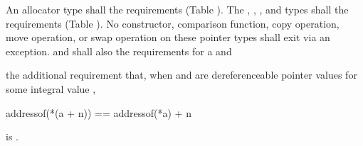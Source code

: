 \setcounter{Paras}{4}
\pnum
An allocator type  shall  the
 requirements (Table ).
The , , , and
 types shall  the
 requirements (Table ).
No constructor,
comparison function, copy operation, move operation, or swap operation on
these pointer types shall exit via an exception.  and  shall also
 the requirements for
a  and
\begin{addedblock}
the additional requirement that, when  and  are
dereferenceable pointer values for some integral value ,
\begin{codeblock}
addressof(*(a + n)) == addressof(*a) + n
\end{codeblock}
is .
\end{addedblock}
